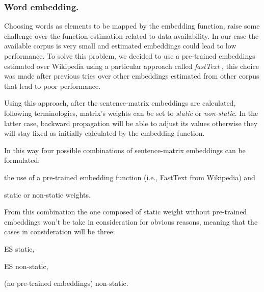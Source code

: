 \subsubsection{Word embedding.}
Choosing words as elements to be mapped by the embedding function, raise some challenge over the function estimation related to data availability. In our case the available corpus is very small and estimated embeddings could lead to low performance.
To solve this problem, we decided to use a pre-trained embeddings estimated over Wikipedia using a particular approach called \emph{fastText} \cite{bojanowski2016enriching}, this choice was made after previous tries over other embeddings estimated from other corpus that lead to poor performance.

Using this approach, after the sentence-matrix embeddings are calculated, following \cite{bojanowski2016enriching} terminologies, matrix's weights can be set to \emph{static} or \emph{non-static}. In the latter case, backward propagation will be able to adjust its values otherwise they will stay fixed as initially calculated by the embedding function.

In this way four possible combinations of sentence-matrix embeddings can be formulated:
\begin{enumerate*}
\item the use of a pre-trained embedding function (i.e., FastText from Wikipedia) and
\item static or non-static weights.
\end{enumerate*}
From this combination the one composed of static weight without pre-trained embeddings won't be take in consideration for obvious reasons, meaning that the cases in consideration will be three:
\begin{enumerate*}
	\item ES static,
	\item ES non-static,
	\item (no pre-trained embeddings) non-static.
\end{enumerate*}

\begin{comment}
From this combination the one composed of static weight without pre-trained embeddings won't be take in consideration for obvious reasons, while we decided to use two pre-trained function from Spanish (i.e., ES) and Catalan (i.e., CA) to see how the use of pre-trained embeddings of a similar language will perform in relation to static/non-static weights.
Meaning that the cases in consideration will be five:
\begin{enumerate*}
\item ES static,
\item CA static,
\item ES nƒon-static,
\item CA non-static,
\item (no pre-trained embeddings) non-static.
\end{enumerate*}
\end{comment}

